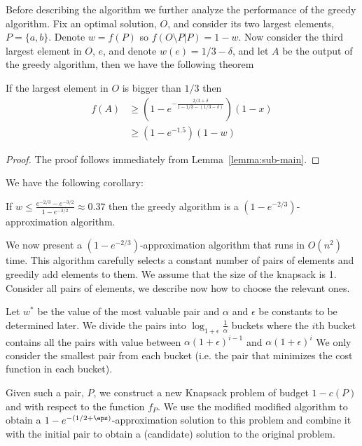 Before describing the algorithm we further analyze the performance of the greedy algorithm.
Fix an optimal solution, $O$, and consider its two largest elements, $P = \{a, b\}$.
Denote $w = f(P)$ so $f(O \setminus P | P) = 1 - w$.
Now consider the third largest element in $O$, $e$, and denote $w(e) = 1/3 - \delta$,
and let $A$ be the output of the greedy algorithm, then we have the following theorem

\begin{lemma}
	\label{eq:sub:greedy}
	If the largest element in $O$ is bigger than $1/3$ then
	\begin{align*}
		f(A) & \geq (1-e^{-\frac{2/3 + \delta}{1 - 1/3 - (1/3 - \delta)}})(1 - x)
		\\		& \geq (1 - e^{-1.5})(1 - w)
	\end{align*}
\end{lemma}

\begin{proof}
	The proof follows immediately from Lemma~\ref{lemma:sub-main}.
\end{proof}

We have the following corollary:
\begin{corollary}
	\label{corollary:greedy-good}
	If $w \leq \frac{e^{-2/3} - e^{-3/2}}{1 - e^{-3/2}} \approx 0.37$ then the greedy algorithm is a $(1 - e^{-2/3})$-approximation algorithm.
\end{corollary}

We now present a $(1-e^{-2/3})$-approximation algorithm that runs in $O(n^2)$ time.
This algorithm carefully selects a constant number of pairs of elements and greedily
add elements to them.
We assume that the size of the knapsack is 1.
Consider all pairs of elements, we describe now how to choose the relevant ones.

Let $w^*$ be the value of the most valuable pair and $\alpha$ and $\epsilon$ be constants to be determined later.
We divide the pairs into $\log_{1 + \epsilon}\frac{1}{\alpha}$ buckets where the $i$th bucket contains all the pairs with value
between $\alpha (1 + \epsilon)^{i - 1}$ and $\alpha (1 + \epsilon)^{i}$
We only consider the smallest pair from each bucket
(i.e. the pair that minimizes the cost function in each bucket).

Given such a pair, $P$, we construct a new Knapsack problem of budget $1 - c(P)$ and with respect to the function $f_P$.
We use the modified modified algorithm to obtain a $1-e^{-(1/2 + \eps)}$-approximation
solution to this problem and combine it with the initial pair to obtain a (candidate)
solution to the original problem.

